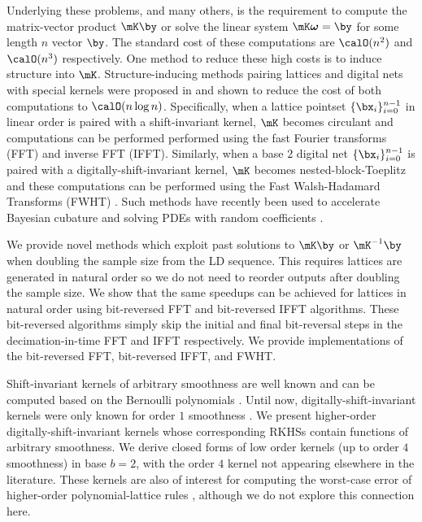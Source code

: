 \documentclass[acmsmall]{acmart}
\newcommand{\FJHNote}[1]{\textcolor{blue}{#1}}
\begin{document}
Underlying these problems, and many others, is the requirement to compute the matrix-vector product $\mK \by$ or solve the linear system $\mK \boldsymbol{\omega} =\by$ for some length $n$ vector $\by$.
The standard cost of these computations are $\calO(n^2)$ and $\calO(n^3)$ respectively. One method to reduce these high costs is to induce structure into $\mK$. Structure-inducing methods pairing lattices and digital nets with special kernels were proposed in \citep{zeng.spline_lattice_digital_net} and shown to reduce the cost of both computations to $\calO(n \log n)$. Specifically, when a lattice pointset $\{\bx_i\}_{i=0}^{n-1}$ in linear order is paired with a shift-invariant kernel, $\mK$ becomes circulant and computations can be performed performed using the fast Fourier transforms (FFT) and inverse FFT (IFFT). Similarly, when a base $2$ digital net $\{\bx_i\}_{i=0}^{n-1}$ is paired with a digitally-shift-invariant kernel, $\mK$ becomes nested-block-Toeplitz and these computations can be performed using the Fast Walsh-Hadamard Transforms (FWHT) \citep{fino.fwht}. Such methods have recently been used to accelerate Bayesian cubature \citep{rathinavel.bayesian_QMC_lattice,rathinavel.bayesian_QMC_sobol,rathinavel.bayesian_QMC_thesis} and solving PDEs with random coefficients \citep{kaarnioja.kernel_interpolants_lattice_rkhs,kaarnioja.kernel_interpolants_lattice_rkhs_serendipitous}.

We provide novel methods which exploit past solutions to $\mK\by$ or $\mK^{-1}\by$ when doubling the sample size from the LD sequence. This requires lattices are generated in natural order so we do not need to reorder outputs after doubling the sample size. We show that the same speedups can be achieved for lattices in natural order using bit-reversed FFT and bit-reversed IFFT algorithms. These bit-reversed algorithms simply skip the initial and final bit-reversal steps in the decimation-in-time FFT and IFFT respectively. We provide implementations of the bit-reversed FFT, bit-reversed IFFT, and FWHT. 

Shift-invariant kernels of arbitrary smoothness are well known and can be computed based on the Bernoulli polynomials \citep{kaarnioja.kernel_interpolants_lattice_rkhs,kaarnioja.kernel_interpolants_lattice_rkhs_serendipitous,cools2021fast,cools2020lattice,sloan2001tractability,kuo2004lattice}. Until now, digitally-shift-invariant kernels were only known for order $1$ smoothness \citep{dick.multivariate_integraion_sobolev_spaces_digital_nets}. We present higher-order digitally-shift-invariant kernels whose corresponding RKHSs contain functions of arbitrary smoothness. We derive closed forms of low order kernels (up to order $4$ smoothness) in base $b=2$, with the order $4$ kernel not appearing elsewhere in the literature. These kernels are also of interest for computing the worst-case error of higher-order polynomial-lattice rules \cite{baldeaux.polylat_efficient_comp_worse_case_error_cbc}, although we do not explore this connection here. 
\end{document}
